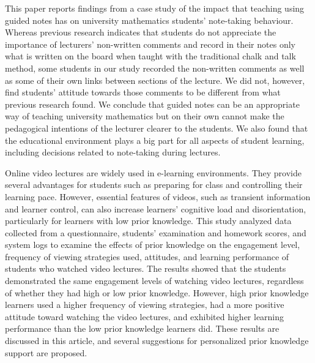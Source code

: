 This paper reports findings from a case study of the impact that teaching using guided notes has on university mathematics students’ note-taking behaviour. Whereas previous research indicates that students do not appreciate the importance of lecturers’ non-written comments and record in their notes only what is written on the board when taught with the traditional chalk and talk method, some students in our study recorded the non-written comments as well as some of their own links between sections of the lecture. We did not, however, find students’ attitude towards those comments to be different from what previous research found. We conclude that guided notes can be an appropriate way of teaching university mathematics but on their own cannot make the pedagogical intentions of the lecturer clearer to the students. We also found that the educational environment plays a big part for all aspects of student learning, including decisions related to note-taking during lectures.\cite{Iannone2019}


Online video lectures are widely used in e-learning environments. They provide several advantages for students such as preparing for class and controlling their learning pace. However, essential features of videos, such as transient information and learner control, can also increase learners’ cognitive load and disorientation, particularly for learners with low prior knowledge. This study analyzed data collected from a questionnaire, students’ examination and homework scores, and system logs to examine the effects of prior knowledge on the engagement level, frequency of viewing strategies used, attitudes, and learning performance of students who watched video lectures. The results showed that the students demonstrated the same engagement levels of watching video lectures, regardless of whether they had high or low prior knowledge. However, high prior knowledge learners used a higher frequency of viewing strategies, had a more positive attitude toward watching the video lectures, and exhibited higher learning performance than the low prior knowledge learners did. These results are discussed in this article, and several suggestions for personalized prior knowledge support are proposed.\cite{Li2019}


